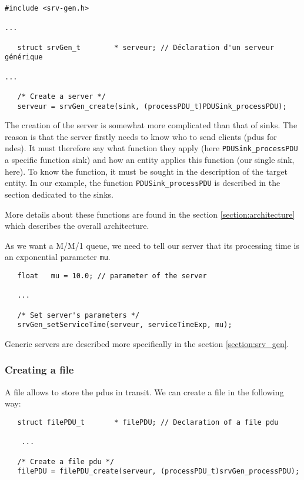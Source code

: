 \begin{verbatim}
#include <srv-gen.h>

...

   struct srvGen_t        * serveur; // Déclaration d'un serveur générique

...

   /* Create a server */
   serveur = srvGen_create(sink, (processPDU_t)PDUSink_processPDU);
\end{verbatim}

   The creation of the server is somewhat more complicated than that of
sinks. The reason is that the server firstly needs to know who to send
clients ({\sc pdu}s for {\sc ndes}). It must therefore say what function they apply (here {\tt PDUSink\_processPDU} a specific function sink) and how an
entity applies this function (our single sink, here). To know the function, it must be sought in the description of the target entity. In our example, the function {\tt PDUSink\_processPDU} is described in the section dedicated to the sinks.

    More details about these functions are found in the section
\ref{section:architecture} which describes the overall architecture.

    As we want a M/M/1 queue, we need to tell our server that its processing time is an exponential parameter {\tt mu}.

  
\begin{verbatim}
   float   mu = 10.0; // parameter of the server

   ...

   /* Set server's parameters */
   srvGen_setServiceTime(serveur, serviceTimeExp, mu);
\end{verbatim}

   Generic servers are described more specifically in the
section \ref{section:srv_gen}.

%
\subsubsection{Creating a file}
 
   A file allows to store the {\sc pdu}s in transit. We can create a file 
in the following way: 
  

\begin{verbatim}
   struct filePDU_t       * filePDU; // Declaration of a file pdu

    ...

   /* Create a file pdu */
   filePDU = filePDU_create(serveur, (processPDU_t)srvGen_processPDU);
\end{verbatim}

